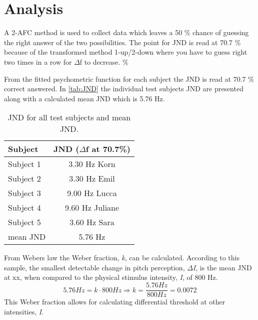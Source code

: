 \section*{Analysis}
A 2-AFC method is used to collect data which leaves a 50 \% chance of guessing the right answer of the two possibilities. The point for JND is read at 70.7 \% because of the transformed method 1-up/2-down where you have to guess right two times in a row for $\Delta$f to decrease.
\%

From the fitted psychometric function for each subject the JND is read at 70.7 \% correct answered. In \autoref{tab:JND} the individual test subjects JND are presented along with a calculated mean JND which is 5.76 Hz. 
%
\begin{table}[H]
	\centering
	\begin{tabular}{l|c}
		Subject     & JND ($\Delta$f at 70.7\%) \\\hline
		Subject 1   & 3.30 Hz  Korn            \\\hline
		Subject 2   & 3.30 Hz Emil            \\\hline
		Subject 3   & 9.00 Hz Lucca             \\\hline
		Subject 4   & 9.60 Hz Juliane           \\\hline
		Subject 5   & 3.60 Hz Sara              \\\hline
		mean JND &    5.76 Hz   
	\end{tabular}
	\caption{JND for all test subjects and mean JND.}
	\label{tab:JND}         
\end{table}
\noindent
%
From Webers law the Weber fraction, \textit{k}, can be calculated. According to this sample, the smallest detectable change in pitch perception, \textit{$\Delta$I}, is the mean JND at xx, when compared to the physical stimulus intensity, \textit{I}, of 800 Hz.
% 
\begin{equation}
5.76 Hz = k \cdot 800 Hz \Rightarrow k = \frac{5.76 Hz}{800 Hz} = 0.0072
\end{equation}
%
This Weber fraction allows for calculating differential threshold at other intensities, \textit{I}. 
%
